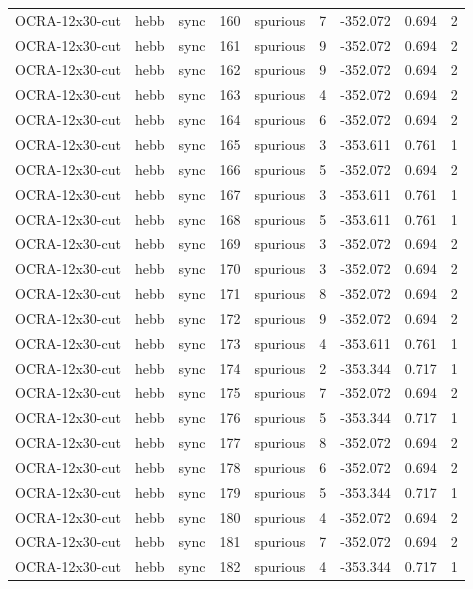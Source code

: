 \begin{tabular}{lllrlrrrr}
OCRA-12x30-cut & hebb & sync & 160 & spurious & 7 & -352.072 & 0.694 & 2 \\
OCRA-12x30-cut & hebb & sync & 161 & spurious & 9 & -352.072 & 0.694 & 2 \\
OCRA-12x30-cut & hebb & sync & 162 & spurious & 9 & -352.072 & 0.694 & 2 \\
OCRA-12x30-cut & hebb & sync & 163 & spurious & 4 & -352.072 & 0.694 & 2 \\
OCRA-12x30-cut & hebb & sync & 164 & spurious & 6 & -352.072 & 0.694 & 2 \\
OCRA-12x30-cut & hebb & sync & 165 & spurious & 3 & -353.611 & 0.761 & 1 \\
OCRA-12x30-cut & hebb & sync & 166 & spurious & 5 & -352.072 & 0.694 & 2 \\
OCRA-12x30-cut & hebb & sync & 167 & spurious & 3 & -353.611 & 0.761 & 1 \\
OCRA-12x30-cut & hebb & sync & 168 & spurious & 5 & -353.611 & 0.761 & 1 \\
OCRA-12x30-cut & hebb & sync & 169 & spurious & 3 & -352.072 & 0.694 & 2 \\
OCRA-12x30-cut & hebb & sync & 170 & spurious & 3 & -352.072 & 0.694 & 2 \\
OCRA-12x30-cut & hebb & sync & 171 & spurious & 8 & -352.072 & 0.694 & 2 \\
OCRA-12x30-cut & hebb & sync & 172 & spurious & 9 & -352.072 & 0.694 & 2 \\
OCRA-12x30-cut & hebb & sync & 173 & spurious & 4 & -353.611 & 0.761 & 1 \\
OCRA-12x30-cut & hebb & sync & 174 & spurious & 2 & -353.344 & 0.717 & 1 \\
OCRA-12x30-cut & hebb & sync & 175 & spurious & 7 & -352.072 & 0.694 & 2 \\
OCRA-12x30-cut & hebb & sync & 176 & spurious & 5 & -353.344 & 0.717 & 1 \\
OCRA-12x30-cut & hebb & sync & 177 & spurious & 8 & -352.072 & 0.694 & 2 \\
OCRA-12x30-cut & hebb & sync & 178 & spurious & 6 & -352.072 & 0.694 & 2 \\
OCRA-12x30-cut & hebb & sync & 179 & spurious & 5 & -353.344 & 0.717 & 1 \\
OCRA-12x30-cut & hebb & sync & 180 & spurious & 4 & -352.072 & 0.694 & 2 \\
OCRA-12x30-cut & hebb & sync & 181 & spurious & 7 & -352.072 & 0.694 & 2 \\
OCRA-12x30-cut & hebb & sync & 182 & spurious & 4 & -353.344 & 0.717 & 1 \\

\end{tabular}

